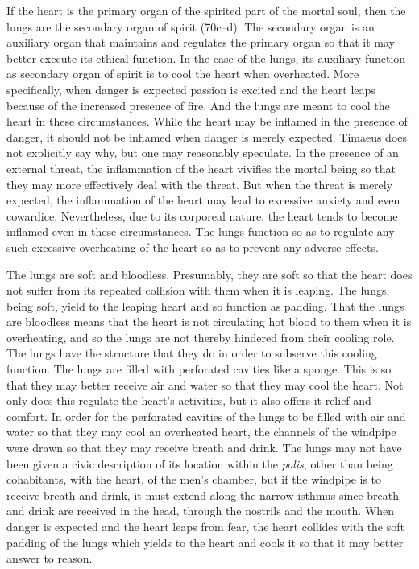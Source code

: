 If the heart is the primary organ of the spirited part of the mortal soul, then the lungs are the secondary organ of spirit (70c--d). The secondary organ is an auxiliary organ that maintains and regulates the primary organ so that it may better execute its ethical function. In the case of the lungs, its auxiliary function as secondary organ of spirit is to cool the heart when overheated. More specifically, when danger is expected passion is excited and the heart leaps because of the increased presence of fire. And the lungs are meant to cool the heart in these circumstances. While the heart may be inflamed in the presence of danger, it should not be inflamed when danger is merely expected. Timaeus does not explicitly say why, but one may reasonably speculate. In the presence of an external threat, the inflammation of the heart vivifies the mortal being so that they may more effectively deal with the threat. But when the threat is merely expected, the inflammation of the heart may lead to excessive anxiety and even cowardice. Nevertheless, due to its corporeal nature, the heart tends to become inflamed even in these circumstances. The lungs function so as to regulate any such excessive overheating of the heart so as to prevent any adverse effects.

The lungs are soft and bloodless. Presumably, they are soft so that the heart does not suffer from its repeated collision with them when it is leaping. The lungs, being soft, yield to the leaping heart and so function as padding. That the lungs are bloodless means that the heart is not circulating hot blood to them when it is overheating, and so the lungs are not thereby hindered from their cooling role. The lungs have the structure that they do in order to subserve this cooling function. The lungs are filled with perforated cavities like a sponge. This is so that they may better receive air and water so that they may cool the heart. Not only does this regulate the heart's activities, but it also offers it relief and comfort. In order for the perforated cavities of the lungs to be filled with air and water so that they may cool an overheated heart, the channels of the windpipe were drawn so that they may receive breath and drink. The lungs may not have been given a civic description of its location within the \emph{polis}, other than being cohabitants, with the heart, of the men's chamber, but if the windpipe is to receive breath and drink, it must extend along the narrow isthmus since breath and drink are received in the head, through the nostrils and the mouth. When danger is expected and the heart leaps from fear, the heart collides with the soft padding of the lungs which yields to the heart and cools it so that it may better answer to reason.

